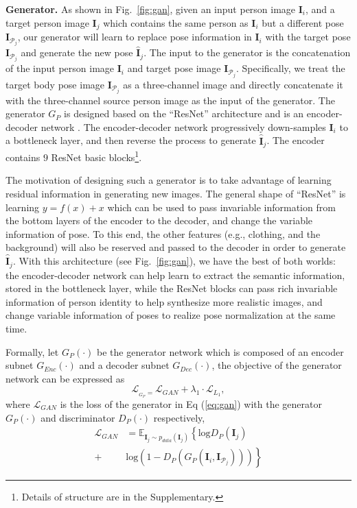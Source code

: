 \documentclass[10pt,letterpaper,twocolumn,10pt,letterpaper,twocolumn]{article}
\begin{document}
\vspace{0.1in}

\noindent \textbf{Generator.} As shown in Fig.~\ref{fig:gan}, given
an input person image $\mathbf{I}_{i}$, and a target person image
$\mathbf{I}_{j}$ which contains the same person as $\mathbf{I}_{i}$
but a different pose $\mathbf{I}_{\mathcal{P}_{j}}$, our generator
will learn to replace pose information in $\mathbf{I}_{i}$ with the
target pose $\mathbf{I}_{\mathcal{P}_{j}}$ and generate the new pose
$\hat{\mathbf{I}}_{j}$. The input to the generator is the concatenation
of the input person image $\mathbf{I}_{i}$ and target pose image
$\mathbf{I}_{\mathcal{P}_{j}}$. Specifically, we treat the target
body pose image $\mathbf{I}_{\mathcal{P}_{j}}$ as a three-channel
image and directly concatenate it with the three-channel source person
image as the input of the generator. The generator $G_{P}$ is designed
based on the ``ResNet'' architecture and is an encoder-decoder network
\cite{hinton2006science}. The encoder-decoder network progressively
down-samples $\mathbf{I}_{i}$ to a bottleneck layer, and then reverse
the process to generate $\hat{\mathbf{I}}_{j}$. The encoder contains $9$ ResNet basic blocks\footnote{Details of structure are in the Supplementary.}. 

The motivation of designing such a generator is to take advantage
of learning residual information in generating new images. The general
shape of ``ResNet'' is learning $y=f(x)+x$ which can be used to
pass invariable information from the bottom layers of the encoder to the decoder,
and change the variable information of pose. To this end, the other
features (e.g., clothing, and the background) will also be reserved
and passed to the decoder in order to generate $\hat{\mathbf{I}}_{j}$. With
this architecture (see Fig.~\ref{fig:gan}), we have the best of
both worlds: the encoder-decoder network can help learn to extract
the semantic information, stored in the bottleneck layer, while  the ResNet
blocks can pass rich invariable information of person identity to
help synthesize more realistic images, and change variable information
of poses to realize pose normalization at the same time.

Formally, let $G_{P}\left(\cdot\right)$ be the generator network
which is composed of an encoder subnet $G_{Enc}\left(\cdot\right)$
and a decoder subnet $G_{Dec}\left(\cdot\right)$, the objective of
the generator network can be expressed as 
\begin{equation}
\mathcal{L}_{_{G_{P}}=}\mathcal{L}_{GAN}+\lambda_{1}\cdot\mathcal{L}_{L_{1}},\label{eq:generator}
\end{equation}
where $\mathcal{L}_{GAN}$ is the loss of the generator in Eq (\ref{eq:gan})
with the generator $G_{P}\left(\cdot\right)$ and discriminator $D_{P}\left(\cdot\right)$
respectively, 
\begin{align}
\mathcal{L}_{GAN} & =\mathbb{E}_{\mathbf{I}_{j}\sim p_{data}\left(\mathbf{I}_{j}\right)}\left\{ \mathrm{log}D_{P}\left(\mathbf{I}_{j}\right)\right.\label{eq:updated_GAN}\\
+ & \left.\mathrm{log}\left(1-D_{P}\left(G_{P}\left(\mathbf{I}_{i},\mathbf{I}_{\mathcal{P}_{j}}\right)\right)\right)\right\} \nonumber 
\end{align}
\end{document}
